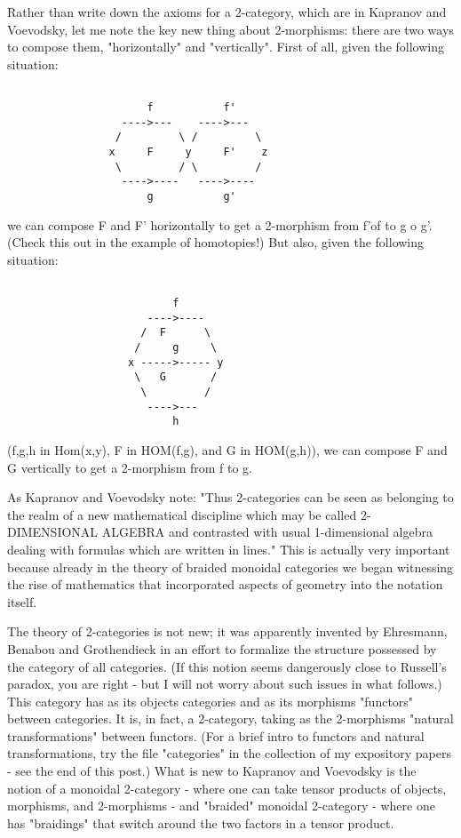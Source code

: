 Rather than write down the axioms for a 2-category, which are in
Kapranov and Voevodsky, let me note the key new thing about 2-morphisms:
there are two ways to compose them, "horizontally" and "vertically".
First of all, given the following situation:


\begin{verbatim}

                      f           f'
                  ---->---    ---->---
                 /         \ /         \
                x     F     y     F'    z
                 \         / \         /
                  ---->----   ---->----
                      g           g'
\end{verbatim}
    

we can compose F and F' horizontally to get a 2-morphism from  f'of  to
g o g'.  (Check this out in the example of homotopies!)  But also, given
the following situation:


\begin{verbatim}

                          f
                      ---->----
                     /  F      \
                    /     g     \
                   x ----->----- y
                    \   G       /
                     \         /
                      ---->---
                          h
\end{verbatim}
    

(f,g,h in Hom(x,y), F in HOM(f,g), and G in HOM(g,h)), we can
compose F and G vertically to get a 2-morphism from f to g.  

As Kapranov and Voevodsky note: "Thus 2-categories can be seen as
belonging to the realm of a new mathematical discipline which may be
called 2-DIMENSIONAL ALGEBRA and contrasted with usual 1-dimensional
algebra dealing with formulas which are written in lines."  This is
actually very important because already in the theory of braided
monoidal categories we began witnessing the rise of mathematics that
incorporated aspects of geometry into the notation itself. 

The theory of 2-categories is not new; it was apparently invented by
Ehresmann, Benabou and Grothendieck in an effort to formalize the
structure possessed by the category of all categories.  (If this notion
seems dangerously close to Russell's paradox, you are right - but I will
not worry about such issues in what follows.)  This category has as its
objects categories and as its morphisms "functors" between categories.  It
is, in fact, a 2-category, taking as the 2-morphisms "natural
transformations" between functors.  (For a brief intro to functors and
natural transformations, try the file "categories" in the collection of
my expository papers - see the end of this post.)  What is new to
Kapranov and Voevodsky is the notion of a monoidal 2-category -
where one can take tensor products of objects, morphisms, and
2-morphisms - and "braided" monoidal 2-category - where one has
"braidings" that switch around the two factors in a tensor product.  

